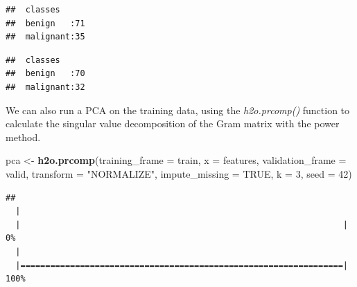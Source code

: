 \documentclass[]{article}
\newenvironment{Shaded}{\begin{snugshade}}{\end{snugshade}}
\newcommand{\KeywordTok}[1]{\textcolor[rgb]{0.13,0.29,0.53}{\textbf{{#1}}}}
\newcommand{\DataTypeTok}[1]{\textcolor[rgb]{0.13,0.29,0.53}{{#1}}}
\newcommand{\DecValTok}[1]{\textcolor[rgb]{0.00,0.00,0.81}{{#1}}}
\newcommand{\StringTok}[1]{\textcolor[rgb]{0.31,0.60,0.02}{{#1}}}
\newcommand{\OtherTok}[1]{\textcolor[rgb]{0.56,0.35,0.01}{{#1}}}
\newcommand{\NormalTok}[1]{{#1}}
\begin{document}
\begin{Shaded}
\end{Shaded}

\begin{verbatim}
##  classes      
##  benign   :71 
##  malignant:35
\end{verbatim}

\begin{Shaded}
\end{Shaded}

\begin{verbatim}
##  classes      
##  benign   :70 
##  malignant:32
\end{verbatim}

We can also run a PCA on the training data, using the
\emph{h2o.prcomp()} function to calculate the singular value
decomposition of the Gram matrix with the power method.

\begin{Shaded}
\begin{Highlighting}[]
\NormalTok{pca <-}\StringTok{ }\KeywordTok{h2o.prcomp}\NormalTok{(}\DataTypeTok{training_frame =} \NormalTok{train,}
           \DataTypeTok{x =} \NormalTok{features,}
           \DataTypeTok{validation_frame =} \NormalTok{valid,}
           \DataTypeTok{transform =} \StringTok{"NORMALIZE"}\NormalTok{,}
           \DataTypeTok{impute_missing =} \OtherTok{TRUE}\NormalTok{,}
           \DataTypeTok{k =} \DecValTok{3}\NormalTok{,}
           \DataTypeTok{seed =} \DecValTok{42}\NormalTok{)}
\end{Highlighting}
\end{Shaded}

\begin{verbatim}
## 
  |                                                                       
  |                                                                 |   0%
  |                                                                       
  |=================================================================| 100%
\end{verbatim}
\end{document}
